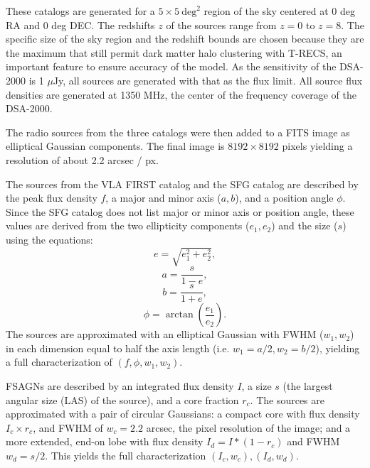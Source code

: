 \documentclass{article}
\begin{document}
\begin{multicols*}{2}
These catalogs are generated for a $5\times 5\ \mbox{deg}^2$ region of the sky centered at 0 deg RA and 0 deg DEC. The redshifts $z$ of the sources range from $z=0$ to $z=8$. The specific size of the sky region and the redshift bounds are chosen because they are the maximum that still permit dark matter halo clustering with T-RECS, an important feature to ensure accuracy of the model. As the sensitivity of the DSA-2000 is 1 $\mu$Jy, all sources are generated with that as the flux limit. All source flux densities are generated at 1350 MHz, the center of the frequency coverage of the DSA-2000. 

The radio sources from the three catalogs were then added to a FITS image as elliptical Gaussian components. The final image is $8192 \times 8192$ pixels yielding a resolution of about 2.2 arcsec / px.

The sources from the VLA FIRST catalog and the SFG catalog are described by the peak flux density $f$, a major and minor axis ($a,b$), and a position angle $\phi$. Since the SFG catalog does not list major or minor axis or position angle, these values are derived from the two ellipticity components ($e_1, e_2$) and the size ($s$) using the equations:
\begin{equation}
    e = \sqrt{e_1^2 + e_2^2}, \label{eq:ellipticity}
\end{equation}
\begin{equation}
    a = \frac{s}{1 - e},
\end{equation}
\begin{equation}
    b = \frac{s}{1 + e},
\end{equation}
\begin{equation}
    \phi = \arctan\left(\frac{e_1}{e_2}\right). \label{eq:posang}
\end{equation}
The sources are approximated with an elliptical Gaussian with FWHM ($w_1, w_2$) in each dimension equal to half the axis length (i.e. $w_1 = a/2, w_2 = b/2$), yielding a full characterization of $(f, \phi, w_1, w_2)$.

FSAGNs are described by an integrated flux density $I$, a size $s$ (the largest angular size (LAS) of the source), and a core fraction $r_c$. The sources are approximated with a pair of circular Gaussians: a compact core with flux density $I_c \times r_c$, and FWHM of $w_c = 2.2$ arcsec, the pixel resolution of the image; and a more extended, end-on lobe with flux density $I_d = I * (1-r_c)$ and FWHM $w_d = s/2$. This yields the full characterization $(I_c, w_c), (I_d, w_d)$.


\end{multicols*}
\end{document}
